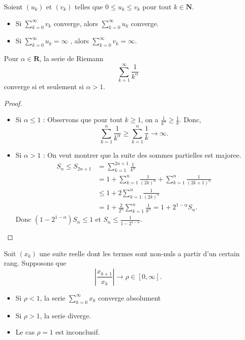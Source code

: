 \begin{theorem}
Soient $(u_{k})$ et $(v_{k})$ telles que $0\le u_{k}\le v_{k}$ pour tout $k\in \mathbf{N}$. 
\begin{itemize}
\item Si $\sum_{k=0}^{\infty}v_{k}$ converge, alors $\sum_{k=0}^{\infty}u_{k}$ converge.
\item Si $\sum_{k=0}^{\infty}u_{k}=\infty$ , alors $\sum_{k=0}^{\infty}v_{k}=\infty$.
\end{itemize}
\end{theorem}
\begin{corollary}
Pour $\alpha \in \mathbf{R}$, la serie de Riemann 
$$
\sum_{k=1}^{\infty}  \frac{1}{k^{\alpha}}
$$
converge si et seulement si $\alpha>1$.
\end{corollary}
\begin{proof}
\begin{itemize}
\item Si $\alpha\le 1$ : Observons que pour tout $k\ge 1$, on a $\frac{1}{k^{\alpha}}\ge \frac{1}{k}$. Donc, 
$$
\sum_{k=1}^{n}  \frac{1}{k^{\alpha}}\ge \sum_{k=1}^{n} \frac{1}{k} \to \infty.
$$
\item Si $\alpha>1$ : On veut montrer que la suite des sommes partielles est majoree. 
\begin{align*}
S_{n} \le S_{2n+1}  & =\sum_{k=1}^{2n+1} \frac{1}{k^{\alpha}} \\
 & = 1+ \sum_{k=1}^{n}  \frac{1}{(2k)^{\alpha}}+\sum_{k=1}^{n} \frac{1}{(2k+1)^{\alpha}} \\
 & \le 1+ 2\sum_{k=1}^{n}  \frac{1}{(2k)^{\alpha}} \\
 & = 1+ \frac{2}{2^{\alpha}} \sum_{k=1}^{n}  \frac{1}{k^{\alpha}}=1+2^{1-\alpha}S_{n}.
\end{align*}
Donc $(1-2^{1-\alpha})S_{n}\le 1$ et $S_{n}\le \frac{1}{1-2^{1-\alpha}}$.
\end{itemize}
\end{proof}
\begin{theorem}
Soit $(x_{k})$ une suite reelle dont les termes sont non-nuls a partir d'un certain rang. Supposons que 
$$
\left\lvert  \frac{x_{k+1}}{x_{k}}  \right\rvert \to  \rho \in[0,\infty].
$$
\begin{itemize}
\item Si $\rho<1$, la serie $\sum_{k=0}^{\infty}x_{k}$ converge absolument
\item Si $\rho>1$, la serie diverge. 
\item Le cas $\rho=1$ est inconclusif.
\end{itemize}
\end{theorem}
